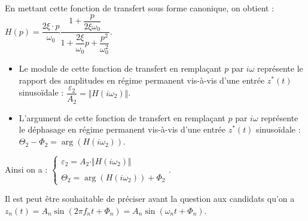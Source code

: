 \documentclass[10pt,fleqn]{article} %
\begin{document}
En mettant cette fonction de transfert sous forme canonique, on  obtient : 
$
H(p)=\dfrac{2\xi\cdot p}{\omega_0}\dfrac{1+\dfrac{p}{2\xi\omega_0}}{1+\dfrac{2\xi}{\omega_0}p+\dfrac{p^2}{\omega_0^2}}
$.

\begin{itemize}
\item Le module de cette fonction de transfert en remplaçant $p$ par $i\omega$ représente le rapport des amplitudes en régime permanent vis-à-vis d'une entrée $z^*(t)$ sinusoïdale : 
$
\dfrac{\varepsilon_2}{A_2}=\Vert H(i\omega_2)\Vert
$.
\item L'argument de cette fonction de transfert en remplaçant $p$ par $i\omega$ représente le déphasage en régime permanent vis-à-vis d'une entrée $z^*(t)$ sinusoïdale : 
$
\Theta_2-\Phi_2=\arg\left(H(i\omega_2)\right)
$.
\end{itemize}

Ainsi on a : 
$
\left\{
\begin{array}{c}
\varepsilon_2=A_2\cdot \Vert H(i\omega_2)\Vert\\
\\
\Theta_2=\arg\left(H(i\omega_2)\right)+\Phi_2
\end{array}
\right.
$.









\begin{remarque}
Il est peut être souhaitable de préciser avant la question aux candidats qu'on a $z_n(t)=A_n\sin \left(2\pi f_n t + \Phi_n \right)=A_n\sin \left(\omega_n t + \Phi_n \right)$. 
\end{remarque}

\subparagraph{}	 %
%
%
\end{document}

